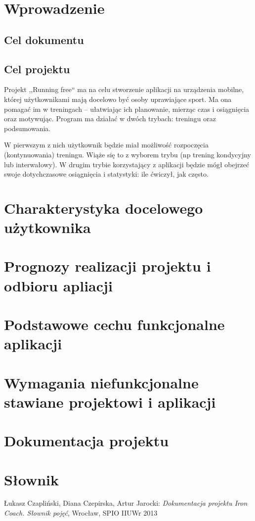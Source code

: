 

\tableofcontents
\clearpage
\section{Wprowadzenie}
\subsection{Cel dokumentu}
\subsection{Cel projektu}
Projekt ,,Running free`` ma na celu stworzenie aplikacji na urządzenia mobilne, której użytkownikami mają docelowo być osoby uprawiające sport. Ma ona pomagać im w treningach -- ułatwiając ich planowanie, mierząc czas i osiągnięcia oraz motywując. 
Program ma działać w dwóch trybach: treningu oraz podsumowania.

W pierwszym z nich użytkownik będzie miał możliwość rozpoczęcia (kontynuowania) treningu. Wiąże się to z wyborem trybu (np trening kondycyjny lub interwałowy).
W drugim trybie korzystający z aplikacji będzie mógł obejrzeć swoje dotychczasowe osiągnięcia i statystyki: ile ćwiczył, jak często. 
\section{Charakterystyka docelowego użytkownika}
\section{Prognozy realizacji projektu i odbioru apliacji}
\section{Podstawowe cechu funkcjonalne aplikacji}
\section{Wymagania niefunkcjonalne stawiane projektowi i aplikacji}
\section{Dokumentacja projektu}
\section{Słownik}
\begin{thebibliography}{99}
   Łukasz Czapliński, Diana Czepirska, Artur Jarocki: {\it Dokumentacja projektu Iron Coach. Słownik pojęć}, Wrocław, SPIO IIUWr 2013
\end{thebibliography}

